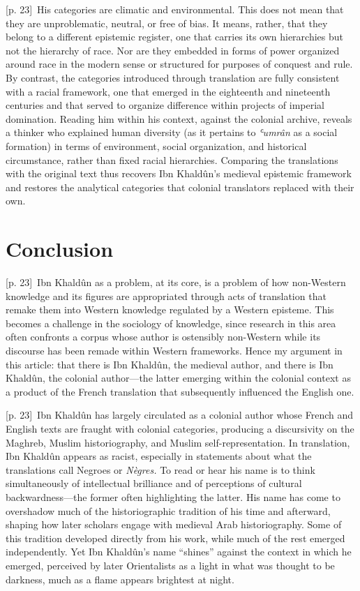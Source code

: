 \documentclass[10pt,a4paper]{article}
\begin{document}
{\scriptsize\color{gray} [p. 23]}\ His categories are climatic and environmental. This does not mean that they are unproblematic, neutral, or free of bias. It means, rather, that they belong to a different epistemic register, one that carries its own hierarchies but not the hierarchy of race. Nor are they embedded in forms of power organized around race in the modern sense or structured for purposes of conquest and rule. By contrast, the categories introduced through translation are fully consistent with a racial framework, one that emerged in the eighteenth and nineteenth centuries and that served to organize difference within projects of imperial domination. Reading him within his context, against the colonial archive, reveals a thinker who explained human diversity (as it pertains to \textit{ʿumrân} as a social formation) in terms of environment, social organization, and historical circumstance, rather than fixed racial hierarchies. Comparing the translations with the original text thus recovers Ibn Khaldûn’s medieval epistemic framework and restores the analytical categories that colonial translators replaced with their own.\par
{}\section*{Conclusion}
{\scriptsize\color{gray} [p. 23]}\ Ibn Khaldûn as a problem, at its core, is a problem of how non-Western knowledge and its figures are appropriated through acts of translation that remake them into Western knowledge regulated by a Western episteme. This becomes a challenge in the sociology of knowledge, since research in this area often confronts a corpus whose author is ostensibly non-Western while its discourse has been remade within Western frameworks. Hence my argument in this article: that there is Ibn Khaldûn, the medieval author, and there is Ibn Khaldûn, the colonial author—the latter emerging within the colonial context as a product of the French translation that subsequently influenced the English one.\par
{\scriptsize\color{gray} [p. 23]}\ Ibn Khaldûn has largely circulated as a colonial author whose French and English texts are fraught with colonial categories, producing a discursivity on the Maghreb, Muslim historiography, and Muslim self-representation. In translation, Ibn Khaldûn appears as racist, especially in statements about what the translations call Negroes or \textit{Nègres.} To read or hear his name is to think simultaneously of intellectual brilliance and of perceptions of cultural backwardness—the former often highlighting the latter. His name has come to overshadow much of the historiographic tradition of his time and afterward, shaping how later scholars engage with medieval Arab historiography. Some of this tradition developed directly from his work, while much of the rest emerged independently. Yet Ibn Khaldûn’s name “shines” against the context in which he emerged, perceived by later Orientalists as a light in what was thought to be darkness, much as a flame appears brightest at night.\par
\end{document}
